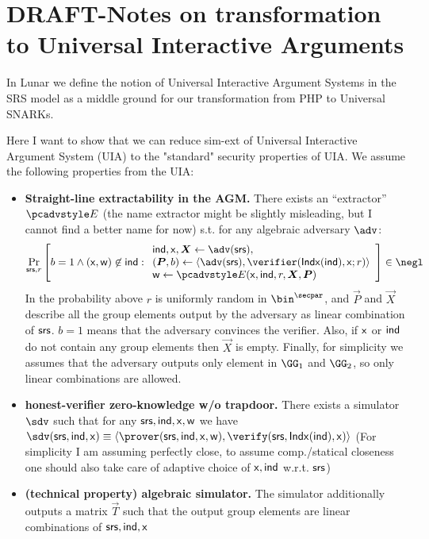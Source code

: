 \documentclass[runningheads,11pt]{llncs}
\begin{document}
\section{DRAFT-Notes on transformation to Universal Interactive Arguments}

In Lunar we define the notion of Universal Interactive Argument Systems in the SRS model
as a middle ground for our transformation from PHP to Universal SNARKs.

Here I want to show that we can reduce sim-ext of Universal Interactive Argument System
(UIA) to the "standard" security properties of UIA.
We assume the following properties from the UIA:
\begin{itemize}
	\item {\bf Straight-line extractability in the AGM.}
		There exists an ``extractor'' $\Ext$ (the name extractor might be slightly misleading, but I
		cannot find a better name for now) s.t. for any algebraic adversary $\adv$:
		\[
			\Prob[\srs,r]{
					b=1 \wedge (\inp,\wit)\not\in\ind:
					\begin{array}{l}
					\ind,\inp, \vec X \gets\adv(\srs),\\
					(\vec P,b) \gets \braket{\adv(\srs),\verifier(\Iphp(\ind),\inp;r)}\\
					\wit \gets \Ext(\inp,\ind,r,\vec X,\vec P)
					\end{array}
					}\in\negl
		\]
		In the probability above $r$ is uniformly random in $\bin^\secpar$, and $\vec P$ and
		$\vec X$	describe all the group elements output by the adversary as linear combination of
		$\mathsf{srs}$. $b=1$ means that the adversary convinces the verifier. Also, if $\mathsf{x}$ or ${\mathsf{ind}}$
		do not contain any group elements then $\vec X$ is	empty. Finally, for simplicity we assumes that the adversary outputs only element in
		$\GG_1$ and $\GG_2$, so only linear combinations are allowed.
	\item {\bf honest-verifier zero-knowledge w/o trapdoor.}
		There exists a simulator $\sdv$ such that for any $\mathsf{srs},{\mathsf{ind}},\mathsf{x},\mathsf{w}$ we have
		$\sdv(\srs,\ind,\inp)\equiv
		\braket{\prover(\srs,\ind,\inp,\wit),\verify(\srs,\Iphp(\ind),\inp)}$
		(For simplicity I am assuming perfectly close, to assume comp./statical closeness one should also
		take care of adaptive choice of $\mathsf{x},{\mathsf{ind}}$ w.r.t. $\mathsf{srs}$)

	\item {\bf (technical property) algebraic simulator.}
		The simulator additionally outputs a matrix $\vec T$ such that the output group elements
		are linear combinations of $\mathsf{srs},{\mathsf{ind}},\mathsf{x}$

\end{itemize}
\end{document}
